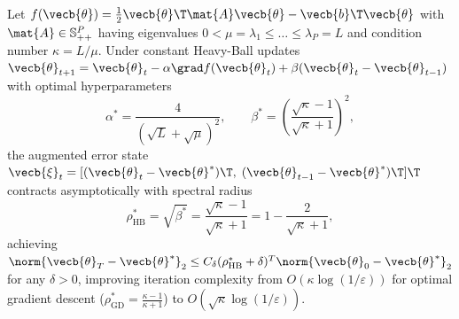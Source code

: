 \documentclass[../../../../master.tex]{subfiles}
\begin{document}
\begin{coremath}
\label{thm:optalg:hb_rate}
Let $f(\vecb{\theta}) = \frac{1}{2}\vecb{\theta}\T \mat{A}\vecb{\theta} - \vecb{b}\T\vecb{\theta}$ with $\mat{A} \in \mathbb{S}_{++}^P$ having eigenvalues $0 < \mu = \lambda_1 \le \dots \le \lambda_P = L$ and condition number $\kappa = L/\mu$. Under constant Heavy-Ball updates $\vecb{\theta}_{t+1} = \vecb{\theta}_t - \alpha \grad f(\vecb{\theta}_t) + \beta(\vecb{\theta}_t - \vecb{\theta}_{t-1})$ with optimal hyperparameters
\begin{equation}
\label{eq:optalg:hb_opt_params}
  \alpha^* = \frac{4}{(\sqrt{L} + \sqrt{\mu})^2}, \qquad \beta^* = \left(\frac{\sqrt{\kappa} - 1}{\sqrt{\kappa} + 1}\right)^2,
\end{equation}
the augmented error state $\vecb{\xi}_t = [(\vecb{\theta}_t - \vecb{\theta}^*)\T,\; (\vecb{\theta}_{t-1} - \vecb{\theta}^*)\T]\T$ contracts asymptotically with spectral radius
\begin{equation}
\label{eq:optalg:hb_spectral}
  \rho_{\mathrm{HB}}^* = \sqrt{\beta^*} = \frac{\sqrt{\kappa} - 1}{\sqrt{\kappa} + 1} = 1 - \frac{2}{\sqrt{\kappa} + 1},
\end{equation}
achieving $\norm{\vecb{\theta}_T - \vecb{\theta}^*}_2 \le C_\delta (\rho_{\mathrm{HB}}^* + \delta)^T \norm{\vecb{\theta}_0 - \vecb{\theta}^*}_2$ for any $\delta > 0$, improving iteration complexity from $O(\kappa \log(1/\varepsilon))$ for optimal gradient descent ($\rho_{\mathrm{GD}}^* = \frac{\kappa - 1}{\kappa + 1}$) to $O(\sqrt{\kappa}\log(1/\varepsilon))$.


\end{coremath}
\end{document}
